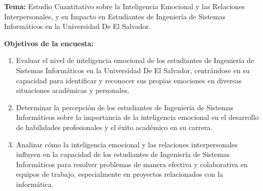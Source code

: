 \documentclass[journal]{IEEEtran}
\begin{document}
\textbf{Tema:} Estudio Cuantitativo sobre la Inteligencia Emocional y las Relaciones Interpersonales, y su Impacto en Estudiantes de Ingeniería de Sistemas Informáticos en la Universidad De El Salvador.

\textbf{Objetivos de la encuesta:}
\begin{enumerate}
	\item Evaluar el nivel de inteligencia emocional de los estudiantes de Ingeniería de Sistemas Informáticos en la Universidad De El Salvador, centrándose en su capacidad para identificar y reconocer sus propias emociones en diversas situaciones académicas y personales.
	\item Determinar la percepción de los estudiantes de Ingeniería de Sistemas Informáticos sobre la importancia de la inteligencia emocional en el desarrollo de habilidades profesionales y el éxito académico en su carrera.
	\item Analizar cómo la inteligencia emocional y las relaciones interpersonales influyen en la capacidad de los estudiantes de Ingeniería de Sistemas Informáticos para resolver problemas de manera efectiva y colaborativa en equipos de trabajo, especialmente en proyectos relacionados con la informática.
\end{enumerate}
\end{document}
